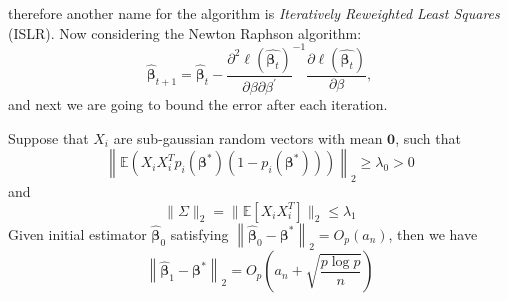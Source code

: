 therefore another name for the algorithm is \textit{Iteratively Reweighted Least Squares} (ISLR). Now considering the Newton Raphson algorithm:
\begin{equation}\label{3.4}
\widehat{\boldsymbol{\beta}}_{t+1} = \widehat{\boldsymbol{\beta}}_{t} - \frac{\partial^{2} \ell(\widehat{\boldsymbol{\beta}_t})}{\partial \beta \partial \beta^{\prime}}^{-1}\frac{\partial \ell(\widehat{\boldsymbol{\beta}_t})}{\partial \beta},
\end{equation}
and next we are going to bound the error after each iteration. 
\begin{theorem}\label{theorem3.1}
	Suppose that $X_i$ are sub-gaussian random vectors with mean $\boldsymbol{0}$, such that
	\begin{equation}\label{3.5}
	\left\|\mathbb{E}\left(X_iX_i^Tp_i\left(\boldsymbol{\beta}^{*}\right)\left(1-p_i\left(\boldsymbol{\beta}^{*}\right)\right)\right)\right\|_2 \geq \lambda_0>0
	\end{equation}
	and
	\begin{equation}\label{3.6}
	\|\Sigma\|_2=\|\mathbb{E}\left[X_iX_i^T\right]\|_2\leq \lambda_1
	\end{equation}
	Given initial estimator $\widehat{\boldsymbol{\beta}}_0$ satisfying  $\left\|\widehat{\boldsymbol{\beta}}_0-\boldsymbol{\beta}^{*}\right\|_2=O_p(a_n)$, then we have
	\begin{equation}
	\left\|\widehat{\boldsymbol{\beta}}_1-\boldsymbol{\beta}^{*}\right\|_2=O_p\left(a_n+\sqrt{\frac{p\log p}{n}}\right)
	\end{equation} 
\end{theorem}
